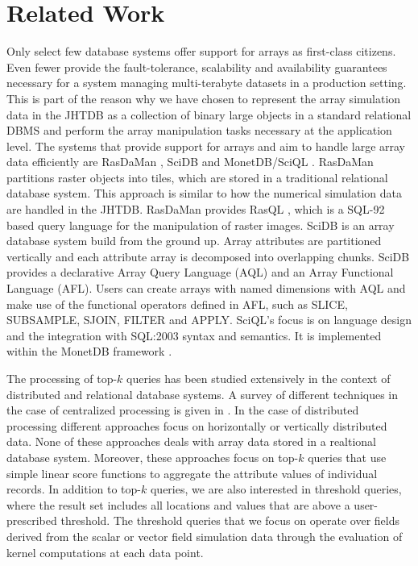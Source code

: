 \documentclass{sig-alternate}
\begin{document}
\section{Related Work}
Only select few database systems offer support for arrays as first-class citizens. Even fewer provide the fault-tolerance, scalability and availability guarantees 
necessary for a system managing multi-terabyte datasets in a production setting. This is part of the reason why we have chosen to represent the array simulation
data in the JHTDB as a collection of binary large objects in a standard relational DBMS and perform the array manipulation tasks necessary at the application level.
The systems that provide
support for arrays and aim to handle large array data efficiently are RasDaMan \cite{Rasdaman}, SciDB \cite{Scidb} and MonetDB/SciQL \cite{Sciql}. RasDaMan
partitions raster objects into tiles, which are stored in a traditional relational database system. This approach is similar to how the numerical simulation data
are handled in the JHTDB. RasDaMan provides RasQL \cite{Rasql}, which is a SQL-92 based query language for the manipulation of raster images. SciDB
is an array database system build from the ground up. Array attributes are partitioned vertically and each attribute array is decomposed into overlapping
chunks. SciDB provides a declarative Array Query Language (AQL) and an Array Functional Language (AFL). Users can create arrays with named
dimensions with AQL and make use of the functional operators defined in AFL, such
as SLICE, SUBSAMPLE, SJOIN, FILTER and APPLY. SciQL's focus is on language design and the integration with SQL:2003 syntax and semantics. It is implemented
within the MonetDB framework \cite{MonetDB}.

The processing of top-$k$ queries has been studied extensively in the context of distributed and relational database systems. A survey of different techniques
in the case of centralized processing is given in \cite{Ilyas}. In the case of distributed processing different approaches focus on horizontally 
\cite{Balke, Vlachou} or vertically \cite{Cao, Chaudhuri, Guntzer, Marian, Michel} distributed data. None of these approaches deals with array data stored in
a realtional database system. Moreover, these approaches focus on top-$k$ queries that use simple linear score functions to aggregate the attribute values of
individual records. In addition to top-$k$ queries, we are also interested in threshold queries, where the result set includes all locations and values that are
above a user-prescribed threshold. The threshold queries that we focus on operate over fields derived from the scalar or vector field simulation data through
the evaluation of kernel computations at each data point.
\end{document}
